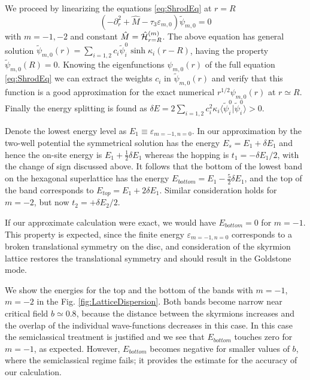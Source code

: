 \documentclass[aps,prb,twocolumn,superscriptaddress,nobalancelastpage]{revtex4-1}
\begin{document}
We proceed by linearizing the equations \eqref{eq:ShrodEq} at $r=R$  
\[
( -\partial^{2}_{r} + \hat M - \tau_3 \varepsilon _{m,0} ){ \tilde \psi }_{m,0} =0 
\]
with $m=-1,-2$ and constant $\hat M = {\hat {\cal H}}^{(m)}_{r=R}$. The above equation has  general solution ${ \tilde \psi }_{m,0} (r) = \sum_{i=1,2} c_{i} \tilde \psi_{i}^{0} \sinh \kappa_{i} (r-R) $, having the property ${ \tilde \psi }_{m,0}(R)=0 $. Knowing the eigenfunctions ${  \psi }_{m,0}(r)$ of the full  equation \eqref{eq:ShrodEq} we can extract the weights $c_{i}$ in ${ \tilde \psi }_{m,0} (r)$  and verify that this function is a good approximation for the exact numerical  $r^{1/2} {\psi }_{m,0}(r)$ at $r\simeq R$.  Finally the energy splitting is found as  
$ \delta E = 2 \sum_{i=1,2} c_{i}^{2}   \kappa_{i} \langle \tilde \psi_{i}^{0} | \tilde \psi_{i}^{0} \rangle >0$. 

Denote the lowest energy level as $E_{1} \equiv \varepsilon _{m=-1,n=0} $.   In our approximation by the two-well potential the symmetrical solution has the energy  $E_{s} = E_{1} + \delta E_{1}$ and hence  the on-site energy is $E_{1}+\tfrac12 \delta E_{1} $ whereas the hopping is $t_{1}= -\delta E_{1} /2$, with the change of sign discussed above. It follows that the bottom of the lowest band on the hexagonal superlattice has the energy $E_{bottom} = E_{1} - \tfrac52 \delta E_{1}$, and the top of the band corresponds to $E_{top} = E_{1} + 2 \delta E_{1}$. Similar consideration holds for $m=-2$, but now $t_{2}= + \delta E_{2} /2$. 

 If our approximate calculation were exact, we would have $E_{bottom} =0$ for $m=-1$.  This property is expected, since the finite energy  $\varepsilon _{m=-1,n=0}$ corresponds to a broken translational symmetry on the disc, and consideration of the skyrmion lattice restores the translational symmetry and should result in the Goldstone mode. 
 
We show the energies for the top and the bottom of the bands with $m=-1$, $m=-2$ in the Fig. \ref{fig:LatticeDispersion}.
Both bands become narrow near critical field $b\simeq 0.8$, because the distance between the skyrmions  increases and the overlap of the individual wave-functions decreases in this case. In this case the semiclassical treatment is justified and we see  that  $E_{bottom}$  touches zero for $m=-1$, as expected. 
However, $E_{bottom}$ becomes negative for smaller values of $b$, where the semiclassical regime fails;  it provides the estimate for the accuracy of our calculation. 
\end{document}
